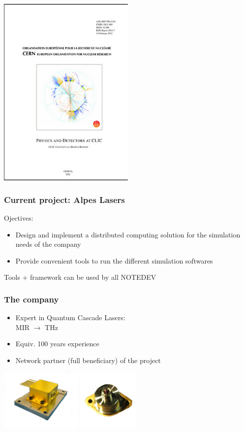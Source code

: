 \documentclass[14pt]{beamer}
\begin{document}
\begin{frame}
\centering
\includegraphics[width=0.5\textwidth]{CLICDR}

\end{frame}

\begin{frame}
\frametitle{Current project: Alpes Lasers}
Ojectives:
\begin{itemize}
\item Design and implement a distributed computing solution for the simulation needs of the company
\item Provide convenient tools to run the different simulation softwares
\end{itemize}
\centering
\alert{Tools + framework can be used by all NOTEDEV}

\end{frame}

\begin{frame}
\frametitle{The company}
\begin{itemize}
\item Expert in Quantum Cascade Lasers: \\MIR $\to$ THz
\item Equiv. 100 years experience
\item Network partner (full beneficiary) of the project
\end{itemize}
\centering
\includegraphics[width=4cm]{hhl}
\includegraphics[width=3cm]{to3_l_c}

\end{frame}
\end{document}
